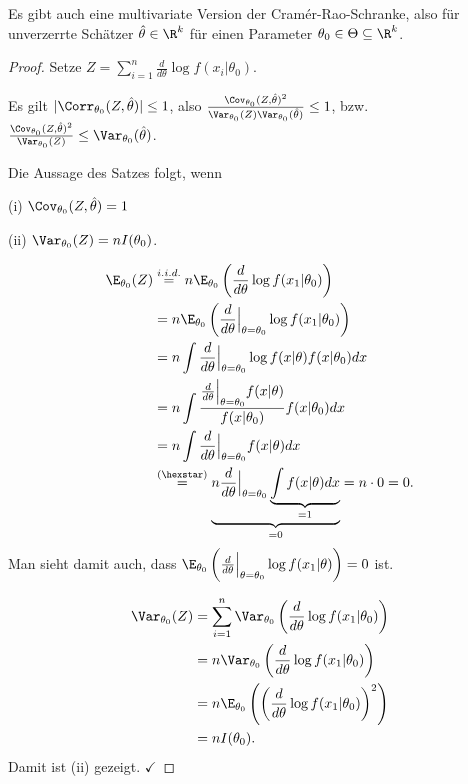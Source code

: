 \documentclass{tstextbook}
\begin{document}
\begin{remark}
	Es gibt auch eine multivariate Version der Cramér-Rao-Schranke, also für unverzerrte Schätzer $ \hat{\theta}\in\R^k $ für einen Parameter $ \theta_0\in\Theta\subseteq \R^k $.
\end{remark}

\begin{proof}
	Setze $ Z=\sum_{i=1}^{n}\frac{d}{d\theta} \log f(x_i|\theta_0) $. 
	
	Es gilt $ |\Corr_{\theta_0}(Z,\hat{\theta})|\le 1 $, also $ \frac{\Cov_{\theta_0}(Z,\hat{\theta})^2}{\Var_{\theta_0}(Z)\Var_{\theta_0}(\hat{\theta})} \le 1 $, bzw. $ \frac{\Cov_{\theta_0}(Z,\hat{\theta})^2}{\Var_{\theta_0}(Z)} \le \Var_{\theta_0}(\hat{\theta}) $. 
	
	Die Aussage des Satzes folgt, wenn 
	
	(i) $ \Cov_{\theta_0}(Z,\hat{\theta}) = 1 $
	
	(ii) $ \Var_{\theta_0}(Z) = nI(\theta_0) $.
	
	\[
	\begin{aligned}
		\E_{\theta_0}(Z) & \overset{i.i.d.}{=} n\E_{\theta_0}\left(\frac{d}{d\theta}\log f(x_1|\theta_0)\right) \\
		& = n\E_{\theta_0}\left(\frac{d}{d\theta}\Big|_{\theta=\theta_0}\log f(x_1|\theta_0)\right) \\
		& = n \int \frac{d}{d\theta}\Big|_{\theta=\theta_0} \log f(x|\theta)f(x|\theta_0) dx \\
		& = n \int \frac{\frac{d}{d\theta}\Big|_{\theta=\theta_0}f(x|\theta)}{f(x|\theta_0)} f(x|\theta_0) dx \\
		& = n \int \frac{d}{d\theta}\Big|_{\theta=\theta_0}f(x|\theta) dx \\
		& \overset{(\hexstar)}{=} \underbrace{n \frac{d}{d\theta}\Big|_{\theta=\theta_0} \underbrace{\int f(x|\theta) dx}_{=1}}_{=0} = n\cdot 0 = 0.
	\end{aligned}
	\]
	Man sieht damit auch, dass $ \E_{\theta_0}\left(\frac{d}{d\theta}\Big|_{\theta=\theta_0} \log f(x_1|\theta)\right) = 0 $ ist. 
	
	\[
	\begin{aligned}
		\Var_{\theta_0}(Z) & = \sum_{i=1}^{n}\Var_{\theta_0}\left(\frac{d}{d\theta}\log f(x_1|\theta_0)\right) \\
		& = n \Var_{\theta_0} \left(\frac{d}{d\theta}\log f(x_1|\theta_0)\right) \\
		& = n \E_{\theta_0} \left(\left(\frac{d}{d\theta}\log f(x_1|\theta_0)\right)^2\right) \\
		& = n I(\theta_0).
	\end{aligned}
	\]
	Damit ist (ii) gezeigt. $ \checkmark $
	

\end{proof}
\end{document}
